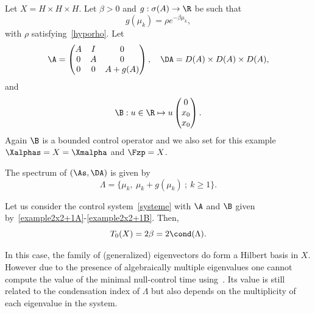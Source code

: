 Let $X=H\times H\times H$. Let $\beta>0$ and $g : \sigma(A) \to \R$ be such that
\begin{equation}\label{Def_g_1}
g(\mu_k) = \rho e^{-\beta \mu_k},
\end{equation}
with $\rho$ satisfying~\eqref{hyporho}. Let
\begin{equation}\label{example2x2+1A}
\A=
\begin{pmatrix} A & I & 0 \\ 0 & A & 0 \\ 0 & 0 &A+g(A)
\end{pmatrix},
\quad
\DA=D(A)\times D(A)\times D(A),
\end{equation}
and
\begin{equation}\label{example2x2+1B}
\B : u \in \R \mapsto u
\begin{pmatrix} 0 \\ x_0 \\ x_0
\end{pmatrix}.
\end{equation}
Again $\B$ is a bounded control operator and we also set for this example $\Xalphas = X\linebreak= \Xmalpha$ and $\Fzp=X$.

The spectrum of $(\As, \DA)$ is given by
\[
\Lambda = \{ \mu_k, \: \mu_k+g(\mu_k) \: ; \: k \geq 1\}.
\]

\begin{prop}\label{Prop:Academique2}
Let us consider the control system~\eqref{systeme} with $\A$ and $\B$ given by~\eqref{example2x2+1A}-\eqref{example2x2+1B}. Then,
\begin{equation}\label{T0_Academique2}
T_0(X) = 2\beta = 2 \cond(\Lambda).
\end{equation}
\end{prop}

\begin{rema}
In this case, the family of (generalized) eigenvectors do form a Hilbert basis in $X$. However due to the presence of algebraically multiple eigenvalues one cannot compute the value of the minimal null-control time using~\cite{AmmarKhodjaBenabdallahGonzalez-BurgosdeTeresa:2014}. Its value is still related to the condensation index of $\Lambda$ but also depends on the multiplicity of each eigenvalue in the system.
\end{rema}


